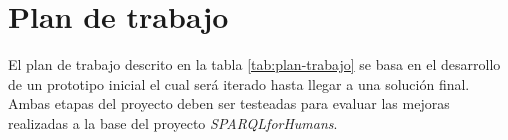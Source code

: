 \documentclass[conference,compsoc]{IEEEtran}
\begin{document}

    \section{Plan de trabajo}

El plan de trabajo descrito en la tabla \ref{tab:plan-trabajo} se basa en el desarrollo
de un prototipo inicial el cual será iterado hasta llegar a una solución final. Ambas etapas
del proyecto deben ser testeadas para evaluar las mejoras realizadas a la base del proyecto
\textit{SPARQLforHumans}.
\end{document}
